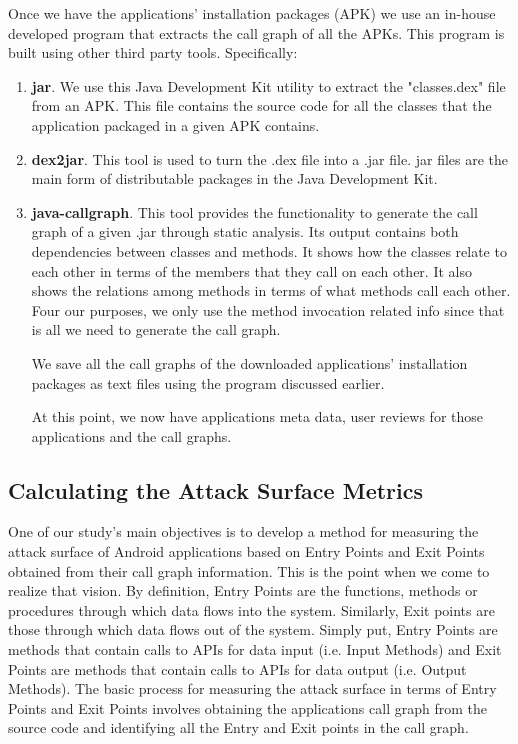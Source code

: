 \documentclass{sig-alternate}
\begin{document}
Once we have the applications' installation packages (APK) we use an in-house developed program that extracts the call graph of all the APKs. This program is built using other third party tools. Specifically:

\begin{enumerate}

\item \textbf{jar}. We use this Java Development Kit utility to extract the "classes.dex" file from an APK. This file contains the source code for all the classes that the application packaged in a given APK contains.

\item \textbf{dex2jar}. This tool is used to turn the .dex file into a .jar file. jar files are the main form of distributable packages in the Java Development Kit.

\item \textbf{java-callgraph}. This tool provides the functionality to generate the call graph of a given .jar through static analysis. Its output contains both dependencies between classes and methods. It shows how the classes relate to each other in terms of the members that they call on each other. It also shows the relations among methods in terms of what methods call each other. Four our purposes, we only use the method invocation related info since that is all we need to generate the call graph.

We save all the call graphs of the downloaded applications' installation packages as text files using the program discussed earlier.

At this point, we now have applications meta data, user reviews for those applications and the call graphs.

\end{enumerate}

\subsection{Calculating the Attack Surface Metrics}

One of our study's main objectives is to develop a method for measuring the attack surface of Android applications based on Entry Points and Exit Points obtained from their call graph information. This is the point when we come to realize that vision. By definition, Entry Points are the functions, methods or procedures through which data flows into the system. Similarly, Exit points are those through which data flows out of the system. Simply put, Entry Points are methods that contain calls to APIs for data input (i.e. Input Methods) and Exit Points are methods that contain calls to APIs for data output (i.e. Output Methods). The basic process for measuring the attack surface in terms of Entry Points and Exit Points involves obtaining the applications call graph from the source code and identifying all the Entry and Exit points in the call graph.
\end{document}
